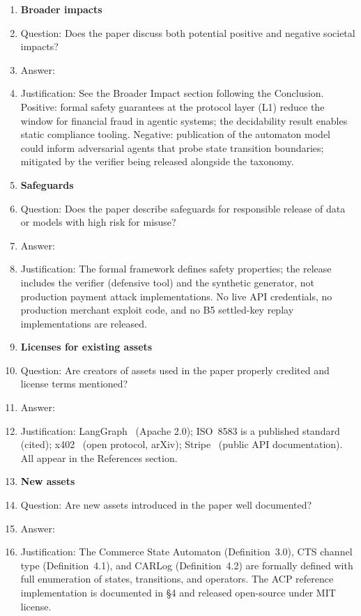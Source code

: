 \begin{enumerate}
\item {\bf Broader impacts}
    \item[] Question: Does the paper discuss both potential positive and negative societal impacts?
    \item[] Answer: \answerYes{}
    \item[] Justification: See the Broader Impact section following the Conclusion. Positive: formal safety guarantees at the protocol layer (L1) reduce the window for financial fraud in agentic systems; the decidability result enables static compliance tooling. Negative: publication of the automaton model could inform adversarial agents that probe state transition boundaries; mitigated by the verifier being released alongside the taxonomy.

\item {\bf Safeguards}
    \item[] Question: Does the paper describe safeguards for responsible release of data or models with high risk for misuse?
    \item[] Answer: \answerYes{}
    \item[] Justification: The formal framework defines safety properties; the release includes the verifier (defensive tool) and the synthetic generator, not production payment attack implementations. No live API credentials, no production merchant exploit code, and no B5 settled-key replay implementations are released.

\item {\bf Licenses for existing assets}
    \item[] Question: Are creators of assets used in the paper properly credited and license terms mentioned?
    \item[] Answer: \answerYes{}
    \item[] Justification: LangGraph~\cite{langgraph} (Apache 2.0); ISO~8583 is a published standard (cited); x402~\cite{x402} (open protocol, arXiv); Stripe~\cite{stripe} (public API documentation). All appear in the References section.

\item {\bf New assets}
    \item[] Question: Are new assets introduced in the paper well documented?
    \item[] Answer: \answerYes{}
    \item[] Justification: The Commerce State Automaton (Definition~3.0), CTS channel type (Definition~4.1), and CARLog (Definition~4.2) are formally defined with full enumeration of states, transitions, and operators. The ACP reference implementation is documented in \S4 and released open-source under MIT license.


\end{enumerate}
